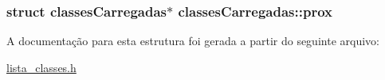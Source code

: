 \subsubsection[{\texorpdfstring{prox}{prox}}]{\setlength{\rightskip}{0pt plus 5cm}struct {\bf classes\+Carregadas}$\ast$ classes\+Carregadas\+::prox}\hypertarget{structclassesCarregadas_a9be874f129111fad8157f3e4205e9e98}{}\label{structclassesCarregadas_a9be874f129111fad8157f3e4205e9e98}


A documentação para esta estrutura foi gerada a partir do seguinte arquivo\+:\begin{DoxyCompactItemize}
\item 
\hyperlink{lista__classes_8h}{lista\+\_\+classes.\+h}\end{DoxyCompactItemize}
